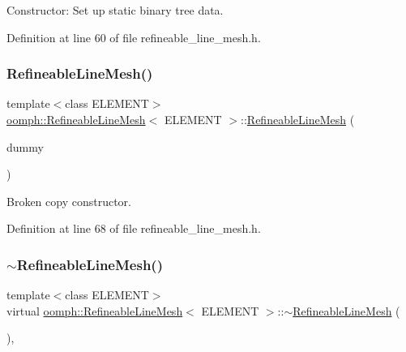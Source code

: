 Constructor\+: Set up static binary tree data. 



Definition at line 60 of file refineable\+\_\+line\+\_\+mesh.\+h.

\mbox{\label{classoomph_1_1RefineableLineMesh_aa630559ec1fe3cbf00f9bb94f815d723}} 
\subsubsection{\texorpdfstring{Refineable\+Line\+Mesh()}{RefineableLineMesh()}\hspace{0.1cm}{\footnotesize\ttfamily [2/2]}}
{\footnotesize\ttfamily template$<$class E\+L\+E\+M\+E\+NT$>$ \\
\hyperlink{classoomph_1_1RefineableLineMesh}{oomph\+::\+Refineable\+Line\+Mesh}$<$ E\+L\+E\+M\+E\+NT $>$\+::\hyperlink{classoomph_1_1RefineableLineMesh}{Refineable\+Line\+Mesh} (\begin{DoxyParamCaption}\item[{const \hyperlink{classoomph_1_1RefineableLineMesh}{Refineable\+Line\+Mesh}$<$ E\+L\+E\+M\+E\+NT $>$ \&}]{dummy }\end{DoxyParamCaption})\hspace{0.3cm}{\ttfamily [inline]}}



Broken copy constructor. 



Definition at line 68 of file refineable\+\_\+line\+\_\+mesh.\+h.

\mbox{\label{classoomph_1_1RefineableLineMesh_a7939a82970c7aa6ad2e3e8662e7e9fd1}} 
\subsubsection{\texorpdfstring{$\sim$\+Refineable\+Line\+Mesh()}{~RefineableLineMesh()}}
{\footnotesize\ttfamily template$<$class E\+L\+E\+M\+E\+NT$>$ \\
virtual \hyperlink{classoomph_1_1RefineableLineMesh}{oomph\+::\+Refineable\+Line\+Mesh}$<$ E\+L\+E\+M\+E\+NT $>$\+::$\sim$\hyperlink{classoomph_1_1RefineableLineMesh}{Refineable\+Line\+Mesh} (\begin{DoxyParamCaption}{ }\end{DoxyParamCaption})\hspace{0.3cm}{\ttfamily [inline]}, {\ttfamily [virtual]}}



